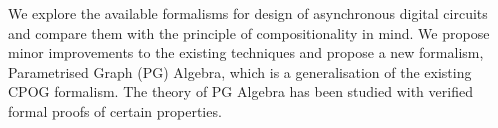 \abstract

We explore the available formalisms for design of asynchronous digital
circuits and compare them with the principle of compositionality in
mind. We propose minor improvements to the existing techniques and
propose a new formalism, Parametrised Graph (PG) Algebra, which is a
generalisation of the existing CPOG formalism. The theory of PG Algebra
has been studied with verified formal proofs of certain properties.



















